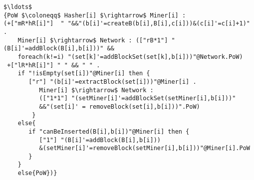 \begin{lstlisting}[style=chor-color,breaklines=true, postbreak=\mbox{\textcolor{red}{$\hookrightarrow$}\space},caption={Choreographic language for the Proof of Work Bitcoin Protocol.},captionpos=b,label={ex3-code}]
$\ldots$
{PoW $\coloneqq$ Hasher[i] $\rightarrow$ Miner[i] :
(+["mR*hR[i]"]  " "&&"(b[i]'=createB(b[i],B[i],c[i]))&(c[i]'=c[i]+1)" . 
	Miner[i] $\rightarrow$ Network : (["rB*1"] "(B[i]'=addBlock(B[i],b[i]))" && 
	foreach(k!=i) "(set[k]'=addBlockSet(set[k],b[i]))"@Network.PoW)
 +["lR*hR[i]"] " " && " " . 
 	if "!isEmpty(set[i])"@Miner[i] then { 
  	   ["r"] "(b[i]'=extractBlock(set[i]))"@Miner[i] . 
	      Miner[i] $\rightarrow$ Network : 
		  (["1*1"] "(setMiner[i]'=addBlockSet(setMiner[i],b[i]))"
		  &&"(set[i]' = removeBlock(set[i],b[i]))".PoW) 
 		}
 	else{
 	   if "canBeInserted(B[i],b[i])"@Miner[i] then { 
 	      ["1"] "(B[i]'=addBlock(B[i],b[i]))
	      &(setMiner[i]'=removeBlock(setMiner[i],b[i]))"@Miner[i].PoW 
 	   }
	}
 	else{PoW})} 
\end{lstlisting}
\begin{comment}
\begin{lstlisting}[style=prism-color,caption={Generated PRISM program for the Peer-To-Peer Protocol.},captionpos=b,label={ex3-gen}]
$\ldots$

module Miner1
   Miner1 : [0..7] init 0;
   b1 : block {m1,0;genesis,0} ; 
   B1 : blockchain [{genesis,0;genesis,0}]; 
   c1 : [0..N] init 0; 
   setMiner1 : list []; 

   [PZKYT] (Miner1=0)   $\rightarrow$  hR1 : (b1'=createB(b1,B1,c1))$\&$(c1'=c1+1)$\&$(Miner1'=1); 
   [EUBVP] (Miner1=0)   $\rightarrow$  hR1 :  (Miner1'=2); 
   [HXYKO] (Miner1=1)   $\rightarrow$  1 : (B1'=addBlock(B1,b1))$\&$(Miner1'=0); 
   [] (Miner1=2)$\&$!isEmpty(set1)  $\rightarrow$  r : (b1'=extractBlock(set1))$\&$(Miner1'=4); 
   [SRKSV] (Miner1=4)   $\rightarrow$  1 : (setMiner1' = addBlockSet(setMiner1 , b1))$\&$(Miner1'=0); 
   [] (Miner1=2)$\&$!(!isEmpty(set1))  $\rightarrow$  1 : (Miner1'=5); 
   [] (Miner1=5)$\&$canBeInserted(B1,b1)  $\rightarrow$  1 : (B1'=addBlock(B1,b1))$\&$(setMiner1'=removeBlock(setMiner1,b1))$\&$(Miner1'=0); 
   [] (Miner1=5)$\&$!(canBeInserted(B1,b1))  $\rightarrow$  1 : (Miner1'=0);

endmodule
$\ldots$
module Network
Network : [0..1] init 0;
   set1 : list []; 
   $\ldots$

   [HXYKO] (Network=0)  $\rightarrow$  1 : (set2'=addBlockSet(set2,b2))$\&$(set3'=addBlockSet(set3,b3))$\&$(set4'=addBlockSet(set4,b4))$\&$(Network'=0); 
   [SRKSV] (Network=0)  $\rightarrow$  1 : (set1' = removeBlock(set1,b1))$\&$(Network'=0); 
   $\ldots$

endmodule

module Hasher1
Hasher1 : [0..1] init 0;

[PZKYT] (Hasher1=0)  $\rightarrow$  mR :  (Hasher1'=0); 
[EUBVP] (Hasher1=0)  $\rightarrow$  lR :  (Hasher1'=0); 

endmodule
\end{lstlisting}
\end{comment}
